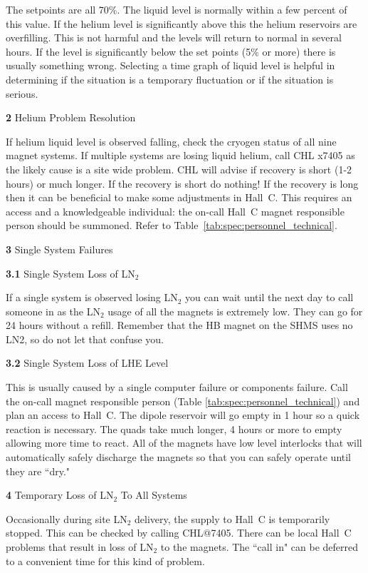 \begin{description}
\item{}\hskip0.3in The setpoints are all 70\%.  The liquid
level is normally within a few percent of this value.  If
the helium level is significantly above this
the helium reservoirs are overfilling.  This is not harmful and the
levels will return to normal in several hours.  If the level is
significantly below the set points (5\% or more) there is usually
something wrong.  Selecting a time graph of liquid level is helpful in
determining if the situation is a temporary fluctuation or if the
situation is serious.
\item{\bf 2}\hskip0.1in Helium Problem Resolution
\item{}\hskip0.3in If helium liquid level is observed falling, check the cryogen status of all nine magnet
systems.  If multiple systems are losing liquid helium,  call CHL x7405 as the
likely cause is a site wide problem.  CHL will advise if recovery is
short (1-2 hours) or much longer.  If the recovery is short do nothing!
If the recovery is long then it can be beneficial to make some
adjustments in Hall~C.  This requires an access and a knowledgeable
individual: the on-call Hall~C magnet responsible person
should be summoned. Refer to Table~\ref{tab:spec:personnel_technical}.
\item{\bf 3}\hskip0.1in Single System Failures
\item{\bf 3.1}\hskip0.1in Single System Loss of LN$_2$
\item{}\hskip0.3in If a single system is observed losing LN$_2$ you can
wait until
the next day to call someone in as the LN$_2$ usage of all the magnets
is extremely low.  They can go for 24 hours without a refill. Remember that the
HB magnet on the SHMS uses no LN2, so do not let that confuse you.
\item{\bf 3.2}\hskip0.1in Single System Loss of LHE Level
\item{}\hskip0.3in This is usually caused by a single computer failure or
components failure.  Call the on-call magnet responsible person (Table \ref{tab:spec:personnel_technical})
and plan an access to Hall~C. The dipole reservoir will go empty in 1 hour so a quick reaction is
necessary.  The quads take much longer, 4 hours or more to empty
allowing more time to react.  All of the magnets have low level
interlocks that will automatically safely discharge the magnets 
so that you can safely operate until they are ``dry."
\item{\bf 4}\hskip0.1in Temporary Loss of LN$_2$ To All Systems
\item{}\hskip0.3in Occasionally during site LN$_2$ delivery, the supply to
Hall~C
is temporarily stopped.  This can be checked by calling CHL@7405.  There
can be local Hall~C problems that result in loss of LN$_2$ to the
magnets. The ``call in" can be deferred to a convenient time for this
kind of problem.
\end{description}
